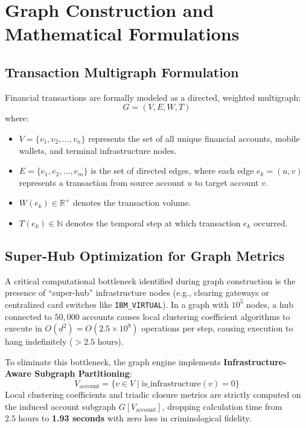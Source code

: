 \section{Graph Construction and Mathematical Formulations}
\subsection{Transaction Multigraph Formulation}
Financial transactions are formally modeled as a directed, weighted multigraph:
\begin{equation}
    G = (V, E, W, T)
\end{equation}
where:
\begin{itemize}
    \item $V = \{v_1, v_2, \dots, v_n\}$ represents the set of all unique financial accounts, mobile wallets, and terminal infrastructure nodes.
    \item $E = \{e_1, e_2, \dots, e_m\}$ is the set of directed edges, where each edge $e_k = (u, v)$ represents a transaction from source account $u$ to target account $v$.
    \item $W(e_k) \in \mathbb{R}^+$ denotes the transaction volume.
    \item $T(e_k) \in \mathbb{N}$ denotes the temporal step at which transaction $e_k$ occurred.
\end{itemize}

\subsection{Super-Hub Optimization for Graph Metrics}
A critical computational bottleneck identified during graph construction is the presence of ``super-hub'' infrastructure nodes (e.g., clearing gateways or centralized card switches like \texttt{IBM\_VIRTUAL}). In a graph with $10^5$ nodes, a hub connected to $50,000$ accounts causes local clustering coefficient algorithms to execute in $O(d^2) = O(2.5 \times 10^9)$ operations per step, causing execution to hang indefinitely ($>2.5\text{ hours}$).

To eliminate this bottleneck, the graph engine implements \textbf{Infrastructure-Aware Subgraph Partitioning}:
\begin{equation}
    V_{\text{account}} = \{v \in V \mid \text{is\_infrastructure}(v) = 0\}
\end{equation}
Local clustering coefficients and triadic closure metrics are strictly computed on the induced account subgraph $G[V_{\text{account}}]$, dropping calculation time from $2.5\text{ hours}$ to \textbf{1.93 seconds} with zero loss in criminological fidelity.

